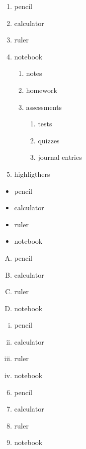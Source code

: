 \documentclass{article}
\begin{document}
\begin{enumerate}
\item pencil
\item calculator
\item ruler
\item notebook
	\begin{enumerate}
	\item notes
	\item homework
	\item assessments
		\begin{enumerate}
		\item tests
		\item quizzes
		\item journal entries
		\end{enumerate}
	\end{enumerate}
\item highligthers
\end{enumerate}

\begin{itemize}
\item pencil
\item calculator
\item ruler
\item notebook
\end{itemize}

\begin{enumerate}[A.]
\item pencil
\item calculator
\item ruler
\item notebook
\end{enumerate}

\begin{enumerate}[i.]
\item pencil
\item calculator
\item ruler
\item notebook
\end{enumerate}

\begin{enumerate}\setcounter{enumi}{5}
\item pencil
\item calculator
\item ruler
\item notebook
\end{enumerate}
\end{document}

